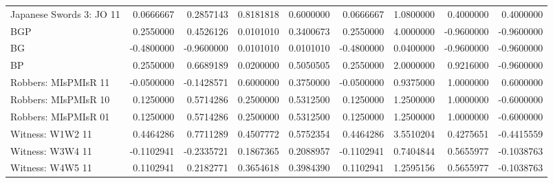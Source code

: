 \documentclass{article}
\begin{document}
\begin{landscape}
\begin{table}
{\begin{tabular}{lrrrrrrrr}
		Japanese Swords 3: JO 11 & 0.0666667 & 0.2857143 & 0.8181818 & 0.6000000 & 0.0666667 & 1.0800000 & 0.4000000 & 0.4000000\\
		\rowcolor{gray!6}  BGP & 0.2550000 & 0.4526126 & 0.0101010 & 0.3400673 & 0.2550000 & 4.0000000 & -0.9600000 & -0.9600000\\
		BG & -0.4800000 & -0.9600000 & 0.0101010 & 0.0101010 & -0.4800000 & 0.0400000 & -0.9600000 & -0.9600000\\
		\rowcolor{gray!6}  BP & 0.2550000 & 0.6689189 & 0.0200000 & 0.5050505 & 0.2550000 & 2.0000000 & 0.9216000 & -0.9600000\\
		Robbers: MIsPMIsR 11 & -0.0500000 & -0.1428571 & 0.6000000 & 0.3750000 & -0.0500000 & 0.9375000 & 1.0000000 & 0.6000000\\
		\rowcolor{gray!6}  Robbers: MIsPMIsR 10 & 0.1250000 & 0.5714286 & 0.2500000 & 0.5312500 & 0.1250000 & 1.2500000 & 1.0000000 & -0.6000000\\
		Robbers: MIsPMIsR 01 & 0.1250000 & 0.5714286 & 0.2500000 & 0.5312500 & 0.1250000 & 1.2500000 & 1.0000000 & -0.6000000\\
		\rowcolor{gray!6}  Witness: W1W2 11 & 0.4464286 & 0.7711289 & 0.4507772 & 0.5752354 & 0.4464286 & 3.5510204 & 0.4275651 & -0.4415559\\
		Witness: W3W4 11 & -0.1102941 & -0.2335721 & 0.1867365 & 0.2088957 & -0.1102941 & 0.7404844 & 0.5655977 & -0.1038763\\
		\rowcolor{gray!6}  Witness: W4W5 11 & 0.1102941 & 0.2182771 & 0.3654618 & 0.3984390 & 0.1102941 & 1.2595156 & 0.5655977 & -0.1038763\\
		\bottomrule
	\end{tabular}}
\end{table}


\end{landscape}
\end{document}
